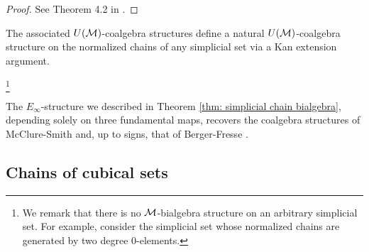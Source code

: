 \begin{proof}
	See Theorem 4.2 in \cite{Medina20prop1}.
\end{proof}

The associated $U(\mathcal{M})$-coalgebra structures define a natural $U(\mathcal{M})$-coalgebra structure on the normalized chains of any simplicial set via a Kan extension argument.

\footnote{We remark that there is no $\mathcal{M}$-bialgebra structure on an arbitrary simplicial set. For example, consider the simplicial set whose normalized chains are generated by two degree 0-elements.}


\begin{remark}
	The $E_\infty$-structure we described in Theorem \ref{thm: simplicial chain bialgebra}, depending solely on three fundamental maps, recovers the coalgebra structures of McClure-Smith \cite{mcclure03cochain} and, up to signs, that of Berger-Fresse \cite{berger04combinatorial}.
\end{remark}

\subsection{Chains of cubical sets}

